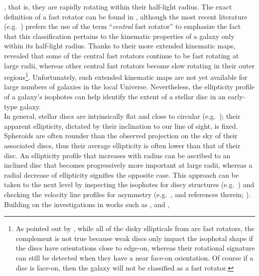\documentclass[useAMS,usenatbib,article]{mnras}
\begin{document}
\citep{atlas3dIII,scott2014}, 
that is, they are rapidly rotating within their half-light radius. 
The exact definition of a fast rotator can be found in \cite{emsellem2007}, 
although the most recent literature (e.g.~\citealt{arnold2011n3115,romanowskyfall2012,arnold2014}) 
prefers the use of the term ``\emph{central} fast rotator'' 
to emphasize the fact that this classification pertains to the kinematic properties of a galaxy only within its half-light radius.
Thanks to their more extended kinematic maps, 
\cite{arnold2014} revealed that some of the central fast rotators continue to be fast rotating at large radii, 
whereas other central fast rotators become slow rotating in their outer regions\footnote{As pointed out by \cite{cappellari2011}, 
while all of the disky ellipticals from \cite{Bender1994} are fast rotators, 
the complement is not true because weak discs only impact the isophotal shape if the discs have orientations close to edge-on, 
whereas their rotational signature can still be detected when they have a near face-on orientation.  
Of course if a disc is face-on, then the galaxy will not be classified as a fast rotator. }.
Unfortunately, such extended kinematic maps are not yet available for large numbers of galaxies in the local Universe. 
Nevertheless, the ellipticity profile of a galaxy's isophotes can help identify the extent of a stellar disc in an early-type galaxy. \\
In general, stellar discs are intrinsically flat and close to circular (e.g.~\citealt{Andersen2001,AndersenBershady2002}); 
their apparent ellipticity, dictated by their inclination to our line of sight, is fixed. 
Spheroids are often rounder than the observed projection on the sky of their associated discs, 
thus their average ellipticity is often lower than that of their disc. 
An ellipticity profile that increases with radius can be ascribed to an inclined disc that becomes progressively more important at large radii, 
whereas a radial decrease of ellipticity signifies the opposite case. 
This approach can be taken to the next level by inspecting the isophotes for discy structures 
(e.g.~\citealt{carter1978,carter1987,capaccioli1987,jedrzejewski1987,BenderMoellenhoff1987}) 
and checking the velocity line profiles for asymmetry 
(e.g.~\citealt{franxillingworth1988ic1459,bender1990,rixwhite1992,scorzabender1995}, and references therein; \citealt{scorza1998}). \\
Building on the investigations in works such as \cite{liller1966}, \cite{Jedrzejewski1987INPROCEEDINGS} and \cite{rixwhite1990}, 
\end{document}
